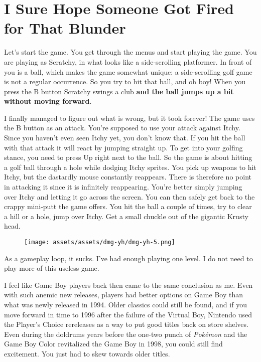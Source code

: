 \documentclass{book}
\begin{document}
\FloatBarrier\needspace{5pt}\section*{I Sure Hope Someone Got Fired for That Blunder}\nopagebreak[4]

Let’s start the game. You get through the menus and start playing the game. You are playing as Scratchy, in what looks like a side-scrolling platformer. In front of you is a ball, which makes the game somewhat unique: a side-scrolling golf game is not a regular occurrence. So you try to hit that ball, and oh boy! When you press the B button Scratchy swings a club \textbf{and the ball jumps up a bit without moving forward}.



I finally managed to figure out what is wrong, but it took forever! The game uses the B button as an attack. You’re supposed to use your attack against Itchy. Since you haven’t even seen Itchy yet, you don’t know that. If you hit the ball with that attack it will react by jumping straight up. To get into your golfing stance, you need to press Up right next to the ball. So the game is about hitting a golf ball through a hole while dodging Itchy sprites. You pick up weapons to hit Itchy, but the dastardly mouse constantly reappears. There is therefore no point in attacking it since it is infinitely reappearing. You’re better simply jumping over Itchy and letting it go across the screen. You can then safely get back to the crappy mini-putt the game offers. You hit the ball a couple of times, try to clear a hill or a hole, jump over Itchy. Get a small chuckle out of the gigantic Krusty head.

\begin{figure}[hbt]
\vskip 10pt
\centering \texttt{[image: assets/assets/dmg-yh/dmg-yh-5.png]}
\vskip 6pt
\end{figure}

As a gameplay loop, it sucks. I’ve had enough playing one level. I do not need to play more of this useless game.

I feel like Game Boy players back then came to the same conclusion as me. Even with such anemic new releases, players had better options on Game Boy than what was newly released in 1994. Older classics could still be found, and if you move forward in time to 1996 after the failure of the Virtual Boy, Nintendo used the Player’s Choice rereleases as a way to put good titles back on store shelves. Even during the doldrums years before the one-two punch of \emph{Pokémon} and the Game Boy Color revitalized the Game Boy in 1998, you could still find excitement. You just had to skew towards older titles.
\end{document}
